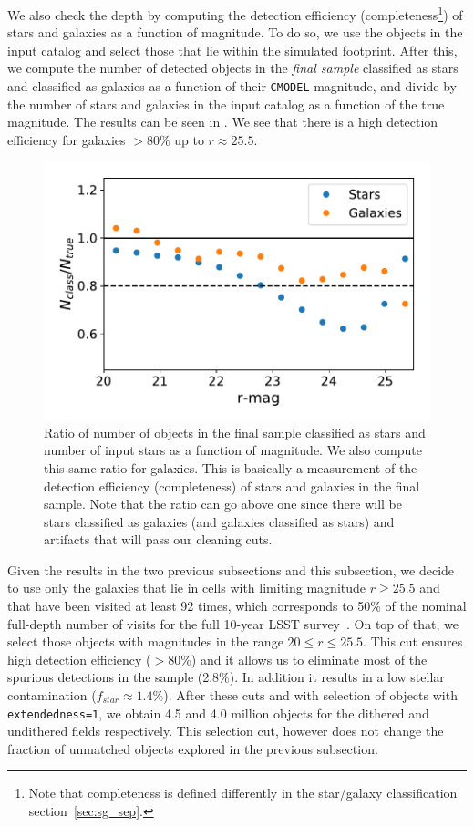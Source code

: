 \documentclass[\docopts]{\docclass}
\begin{document}
We also check the depth by computing the detection efficiency (completeness\footnote{Note that completeness is defined differently in the star/galaxy classification section~\ref{sec:sg_sep}.}) of stars and galaxies as a function of magnitude. To do so, we use the objects in the input catalog and select those that lie within the simulated footprint. After this, we compute the number of detected objects in the \textit{final sample} classified as stars and classified as galaxies as a function of their \texttt{CMODEL} magnitude, and divide by the number of stars and galaxies in the input catalog as a function of the true magnitude. The results can be seen in . We see that there is a high detection efficiency for galaxies $> 80\%$ up to $r \approx 25.5$.  

\begin{figure}
\centering
\includegraphics[width=0.9\columnwidth]{stellar_detection_efficiency.pdf}
\caption{Ratio of number of objects in the final sample classified as stars and number of input stars as a function of magnitude. We also compute this same ratio for galaxies. This is basically a measurement of the detection efficiency (completeness) of stars and galaxies in the final sample. Note that the ratio can go above one since there will be stars classified as galaxies (and galaxies classified as stars) and artifacts that will pass our cleaning cuts.}
\label{fig:stellar_detection_efficiency}
\end{figure}

Given the results in the two previous subsections and this subsection, we decide to use only the galaxies that lie in cells with limiting magnitude $r \geq 25.5$ and that have been visited at least 92 times, which corresponds to 50\% of the nominal full-depth number of visits for the full 10-year LSST survey~\citep{Overview}. On top of that, we select those objects with magnitudes in the range $20 \leq r \leq 25.5$. This cut ensures high detection efficiency ($>80\%$) and it allows us to eliminate most of the spurious detections in the sample (2.8\%). In addition it results in a low stellar contamination ($f_{star} \approx 1.4\%$). After these cuts and with selection of objects with \texttt{extendedness=1}, we obtain 4.5 and 4.0 million objects for the dithered and undithered fields respectively. This selection cut, however does not change the fraction of unmatched objects explored in the previous subsection.
\end{document}
